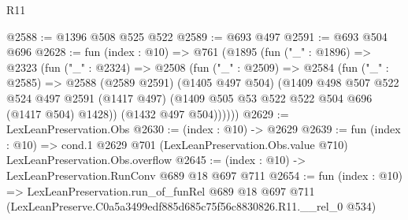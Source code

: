 \begin{lexlean}{R11}
\begin{coremodule}
@2588 := @1396 @508 @525 @522
@2589 := @693 @497
@2591 := @693 @504 @696
@2628 := fun (index : @10) =>
  @761
    (@1895
      (fun ("_" : @1896) =>
      @2323
        (fun ("_" : @2324) =>
        @2508
          (fun ("_" : @2509) =>
          @2584
            (fun ("_" : @2585) =>
            @2588
              (@2589 @2591)
              (@1405 @497 @504)
              (@1409
                @498
                @507
                @522
                @524
                @497
                @2591
                (@1417 @497)
                (@1409 @505 @53 @522 @522 @504 @696 (@1417 @504) @1428))
              (@1432 @497 @504))))))
@2629 := LexLeanPreservation.Obs
@2630 := (index : @10) -> @2629
@2639 := fun (index : @10) =>
  cond.{1} @2629 @701 (LexLeanPreservation.Obs.value @710) LexLeanPreservation.Obs.overflow
@2645 := (index : @10) -> LexLeanPreservation.RunConv @689 @18 @697 @711
@2654 := fun (index : @10) =>
  LexLeanPreservation.run_of_funRel
    @689
    @18
    @697
    @711
    (LexLeanPreserve.C0a5a3499edf885d685c75f56c8830826.R11.__rel_0 @534)
\end{coremodule}
\end{lexlean}
